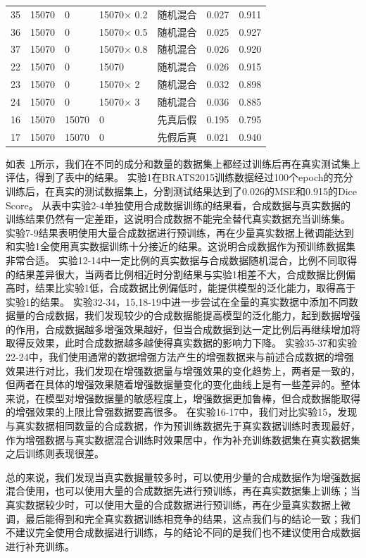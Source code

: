 \documentclass[letterpaper]{article} %
\begin{document}
\begin{table}[t]
{\begin{tabular}{lllllll}
			35& 15070 &0 & 15070$\times$ 0.2   &随机混合 &0.027 &0.911 \\
			36& 15070 &0 & 15070$\times$ 0.5   &随机混合 &0.025 &0.927 \\
			37& 15070 &0 & 15070$\times$ 0.8   &随机混合 &0.026 &0.920 \\
			22& 15070 &0 & 15070           &随机混合 &0.026 &0.915 \\
			23& 15070 &0 & 15070$\times$ 2 &随机混合 &0.032 &0.898 \\
			24& 15070 &0 & 15070$\times$ 3 &随机混合 &0.036 &0.885 \\
			
			16& 15070 & 15070 &0  &先真后假 &0.195 &0.795 \\
			17& 15070 & 15070 &0  &先假后真 &0.021 &0.940 \\
			\bottomrule
		\end{tabular}
	}
	\label{use_test}
\end{table}
如表~\ref{use_test}所示，我们在不同的成分和数量的数据集上都经过训练后再在真实测试集上评估，得到了表中的结果。
实验1在BRATS2015训练数据经过100个epoch的充分训练后，在真实的测试数据集上，分割测试结果达到了0.026的MSE和0.915的Dice Score。
从表中实验2-4单独使用合成数据训练的结果看，合成数据与真实数据的训练结果仍然有一定差距，这说明合成数据不能完全替代真实数据充当训练集。
实验7-9结果表明使用大量合成数据进行预训练，再在少量真实数据上微调能达到和实验1全使用真实数据训练十分接近的结果。这说明合成数据作为预训练数据集非常合适。
实验12-14中一定比例的真实数据与合成数据随机混合，比例不同取得的结果差异很大，当两者比例相近时分割结果与实验1相差不大，合成数据比例偏高时，结果比实验1低，合成数据比例偏低时，能提供模型的泛化能力，取得高于实验1的结果。
实验32-34，15,18-19中进一步尝试在全量的真实数据中添加不同数据量的合成数据，我们发现较少的合成数据能提高模型的泛化能力，起到数据增强的作用，合成数据越多增强效果越好，但当合成数据到达一定比例后再继续增加将取得反效果，此时合成数据越多越使得真实数据的影响力下降。
实验35-37和实验22-24中，我们使用通常的数据增强方法产生的增强数据来与前述合成数据的增强效果进行对比，我们发现在增强数据量与增强效果的变化趋势上，两者是一致的，但两者在具体的增强效果随着增强数据量变化的变化曲线上是有一些差异的。整体来说，在模型对增强数据量的敏感程度上，增强数据更加鲁棒，但合成数据能取得的增强效果的上限比曾强数据要高很多。
在实验16-17中，我们对比实验15，发现与真实数据相同数量的合成数据，作为预训练数据先于真实数据训练时表现最好，作为增强数据与真实数据混合训练时效果居中，作为补充训练数据集在真实数据集之后训练则表现很差。

总的来说，我们发现当真实数据量较多时，可以使用少量的合成数据作为增强数据混合使用，也可以使用大量的合成数据先进行预训练，再在真实数据集上训练；当真实数据较少时，可以使用大量的合成数据进行预训练，再在少量真实数据上微调，最后能得到和完全真实数据训练相竞争的结果，这点我们与\cite{4shin2018medical}的结论一致；我们不建议完全使用合成数据进行训练，与\cite{4shin2018medical}的结论不同的是我们也不建议使用合成数据进行补充训练。
\end{document}
